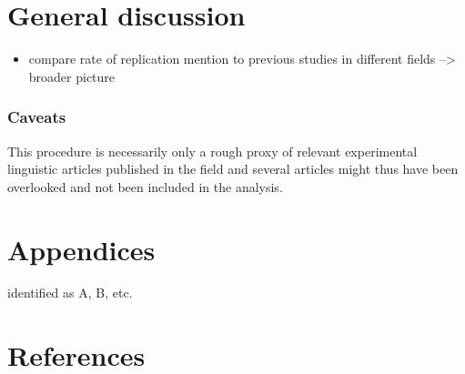 \documentclass[]{elsarticle} %
\providecommand{\tightlist}{%
  \setlength{\itemsep}{0pt}\setlength{\parskip}{0pt}}
\begin{document}
\hypertarget{general-discussion}{%
\section{General discussion}\label{general-discussion}}

\begin{itemize}
\tightlist
\item
  compare rate of replication mention to previous studies in different
  fields --\textgreater{} broader picture
\end{itemize}

\hypertarget{caveats}{%
\subsubsection{Caveats}\label{caveats}}

This procedure is necessarily only a rough proxy of relevant
experimental linguistic articles published in the field and several
articles might thus have been overlooked and not been included in the
analysis.

\hypertarget{appendices}{%
\section{Appendices}\label{appendices}}

identified as A, B, etc.

\hypertarget{references}{%
\section*{References}\label{references}}
\end{document}
